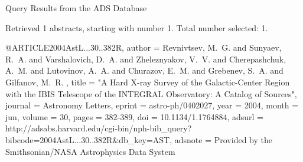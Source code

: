 Query Results from the ADS Database


Retrieved 1 abstracts, starting with number 1.  Total number selected: 1.

@ARTICLE{2004AstL...30..382R,
   author = {{Revnivtsev}, M.~G. and {Sunyaev}, R.~A. and {Varshalovich}, D.~A. and 
	{Zheleznyakov}, V.~V. and {Cherepashchuk}, A.~M. and {Lutovinov}, A.~A. and 
	{Churazov}, E.~M. and {Grebenev}, S.~A. and {Gilfanov}, M.~R.
	},
    title = "{A Hard X-ray Survey of the Galactic-Center Region with the IBIS Telescope of the INTEGRAL Observatory: A Catalog of Sources}",
  journal = {Astronomy Letters},
   eprint = {astro-ph/0402027},
     year = 2004,
    month = jun,
   volume = 30,
    pages = {382-389},
      doi = {10.1134/1.1764884},
   adsurl = {http://adsabs.harvard.edu/cgi-bin/nph-bib_query?bibcode=2004AstL...30..382R&db_key=AST},
  adsnote = {Provided by the Smithsonian/NASA Astrophysics Data System}
}


